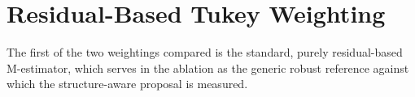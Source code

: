 %
%
%
%

\section{Residual-Based Tukey Weighting}
\label{sec:tukey}

The first of the two weightings compared is the standard, purely
residual-based M-estimator, which serves in the ablation as the generic robust
reference against which the structure-aware proposal is measured.

